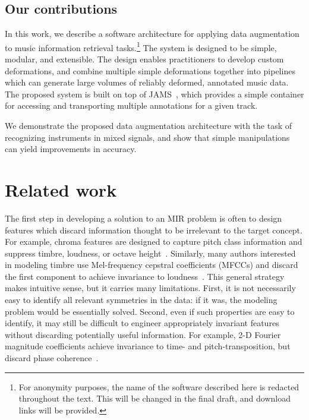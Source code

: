 \documentclass{article}
\begin{document}
\subsection{Our contributions}
In this work, we describe a software architecture for applying data augmentation to music
information retrieval tasks.\footnote{For anonymity purposes, the name of the software 
    described here is redacted throughout the text.  This will be changed in the final
draft, and download links will be provided.}
The system is designed to be simple, modular, and
extensible. The design enables practitioners to develop custom deformations, and combine
multiple simple deformations together into pipelines which can generate large volumes of
reliably deformed, annotated music data.  The proposed system is built on top of
JAMS~\cite{humphreyjams}, which provides a simple container for accessing and
transporting multiple annotations for a given track.

We demonstrate the proposed data augmentation architecture with the 
task of recognizing instruments in mixed signals, and show that simple
manipulations can yield improvements in accuracy.

\section{Related work}

The first step in developing a solution to an MIR problem is often to
design features which discard information thought to be irrelevant to the target
concept.  For example, chroma features are designed to capture pitch class information
and suppress timbre, loudness, or octave height~\cite{muller2011chroma}.
Similarly, many authors interested in modeling timbre
use Mel-frequency cepstral coefficients (MFCCs) and discard the first component to
achieve invariance to loudness~\cite{pampalk2004matlab}.
This general strategy makes intuitive sense, but it carries many limitations.
First, it is not necessarily easy to identify all relevant symmetries in the
data: if it was, the modeling problem would be essentially solved.
Second, even if such properties are easy to identify, it may still be difficult to
engineer appropriately invariant features without discarding potentially useful
information.  For example, 2-D Fourier magnitude coefficients achieve invariance to
time- and pitch-transposition, but discard phase coherence~\cite{ellis2012large}.
\end{document}
